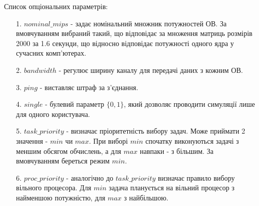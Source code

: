 Список опціональних параметрів:
\begin{itemize}
	\item[1.] $nominal\_mips$ - задає номінальний множник потужностей ОВ. За вмовчуванням вибраний такий, що відповідає за множення матриць розмірів 2000 за 1.6 секунди, що відносно відповідає потужності одного ядра у сучасних комп'ютерах.
	\item[2.] $bandwidth$ - регулює ширину каналу для передачі даних з кожним ОВ.
	\item[3.] $ping$ - виставляє штраф за з'єднання.
	\item[4.] $single$ - булевий параметр $\{0,1\}$, який дозволяє проводити симуляції лише для одного користувача.
	\item[5.] $task\_priority$ - визначає пріоритетність вибору задач. Може приймати 2 значення - $min$ чи $max$. При виборі $min$ спочатку виконуються задачі з меншим обсягом обчислень, а для $max$ навпаки - з більшим. За вмовчуванням береться режим $min$.
	\item[6.] $proc\_priority$ - аналогічно до $task\_priority$ визначає правило вибору вільного процесора. Для $min$ задача планується на вільний процесор з найменшою потужністю, для $max$ з найбільшою.
\end{itemize}


